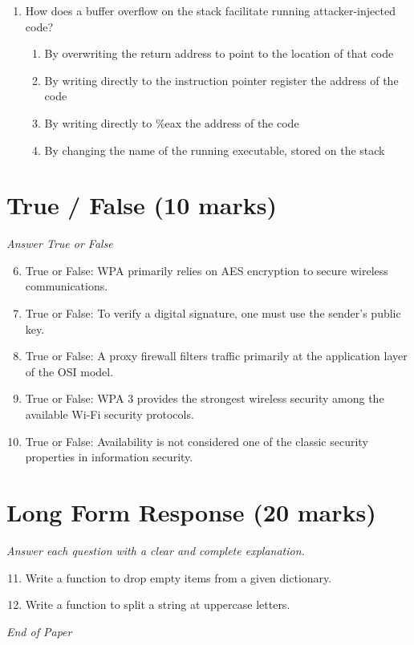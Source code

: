 \documentclass[12pt]{article}
\begin{document}
\begin{enumerate}[label=\arabic*.]
\begin{enumerate}[label=(\alph*)]
    \item xyz
    \item xy
    \item xxzy
    \item xxxxy
\end{enumerate}
\item How does a buffer overflow on the stack facilitate running attacker-injected code?
\begin{enumerate}[label=(\alph*)]
    \item By overwriting the return address to point to the location of that code
    \item By writing directly to the instruction pointer register the address of the code
    \item By writing directly to \%eax the address of the code
    \item By changing the name of the running executable, stored on the stack
\end{enumerate}
\end{enumerate}

\section*{True / False (10 marks)}
\textit{Answer True or False}
\begin{enumerate}[label=\arabic*.]
\setcounter{enumi}{5}
\item True or False: WPA primarily relies on AES encryption to secure wireless communications.
\item True or False: To verify a digital signature, one must use the sender's public key.
\item True or False: A proxy firewall filters traffic primarily at the application layer of the OSI model.
\item True or False: WPA 3 provides the strongest wireless security among the available Wi-Fi security protocols.
\item True or False: Availability is not considered one of the classic security properties in information security.
\end{enumerate}

\section*{Long Form Response (20 marks)}
\textit{Answer each question with a clear and complete explanation.}
\begin{enumerate}[label=\arabic*.]
\setcounter{enumi}{10}
\item Write a function to drop empty items from a given dictionary.
\item Write a function to split a string at uppercase letters.
\end{enumerate}

\vfill
\noindent\textit{End of Paper}
\end{document}
